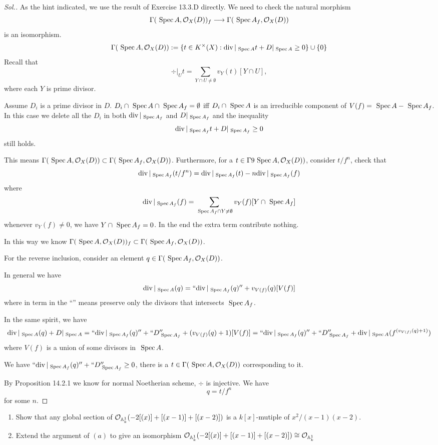 \documentclass[11pt]{book} %
\begin{document}
\begin{proof}[Sol.]
As the hint indicated, we use the result of Exercise 13.3.D directly. We need to check the natural morphism
$$
\Gamma(\text{ Spec\,} A,{\cal O}_X(D))_f\longrightarrow\Gamma(\text{ Spec\,} A_f,{\cal O}_X(D))
$$
is an isomorphism.
$$
\Gamma(\text{ Spec\,} A,{\cal O}_X(D)):=\{t\in K^\times(X):\text{div\,}|_{\text{ Spec\,} A}t+D|_{\text{ Spec\,} A}\geq 0\}\cup \{0\}
$$
Recall that 
$$
\div|_U t=\sum_{Y\cap U\neq \emptyset} v_Y(t)[Y\cap U],
$$
where each $Y$ is prime divisor.

Assume $D_i$ is a prime divisor in $D$.
$D_i\cap \text{ Spec\,} A\cap \text{ Spec\,} A_f=\emptyset$ iff $D_i\cap \text{ Spec\,} A$ is an irreducible component of $V(f)=\text{ Spec\,} A-\text{ Spec\,} A_f$. In this case we delete all the $D_i$ in both $\text{div\,}|_{\text{ Spec\,} A_f}$ and $D|_{\text{ Spec\,} A_f}$ and the inequality 
$$
\text{div\,}|_{\text{ Spec\,} A_f}t+D|_{\text{ Spec\,} A_f}\geq 0
$$ 
still holds.

This means $\Gamma(\text{ Spec\,} A,{\cal O}_X(D))\subset \Gamma(\text{ Spec\,} A_f,{\cal O}_X(D))$. Furthermore, for a $t\in \Gamma9\text{ Spec\,} A,{\cal O}_X(D))$, consider $t/f^n$, check that 
$$
\text{div\,}|_{\text{ Spec\,} A_f}(t/f^n)=\text{div\,}|_{\text{ Spec\,} A_f}(t)-n\text{div\,}|_{\text{ Spec\,} A_f}(f)
$$
where
$$
\text{div\,}|_{\text{ Spec\,} A_f}(f)=\sum_{\text{ Spec\,} A_f\cap Y\neq \emptyset}v_Y(f)[Y\cap \text{ Spec\,} A_f]
$$
whenever $v_Y(f)\neq 0$, we have $Y\cap \text{ Spec\,} A_f=0$. In the end the extra term contribute nothing.

In this way we know $\Gamma(\text{ Spec\,} A,{\cal O}_X(D))_f\subset\Gamma(\text{ Spec\,} A_f,{\cal O}_X(D))$.

For the reverse inclusion, consider an element $q\in \Gamma(\text{ Spec\,} A_f,{\cal O}_X(D))$.

In general
we have
$$
\text{div\,}|_{\text{ Spec\,} A} (q)=``\text{div\,}|_{\text{ Spec\,} A_f}(q)''+v_{V(f)}(q)[V(f)]
$$
where in term in the ``'' means preserve only the divisors that intersects $\text{ Spec\,} A_f$.

In the same spirit, we have 
$$
\text{div\,}|_{\text{ Spec\,} A} (q)+D|_{\text{ Spec\,} A}=``\text{div\,}|_{\text{ Spec\,} A_f}(q)''+``D_{\text{ Spec\,} A_f}''+(v_{V(f)}(q)+1)[V(f)]
= ``\text{div\,}|_{\text{ Spec\,} A_f}(q)''+``D_{\text{ Spec\,} A_f}''+\text{div\,}|_{\text{ Spec\,} A}(f^{(v_{V(f)}(q)+1)})
$$
where $V(f)$ is a union of some divisors in $\text{ Spec\,} A$.

We have $``\text{div\,}|_{\text{ Spec\,} A_f}(q)''+``D_{\text{ Spec\,} A_f}''\geq 0$, there is a $t\in \Gamma(\text{ Spec\,} A,{\cal O}_X(D))$ corresponding to it.

By Proposition 14.2.1 we know for normal Noetherian scheme, $\div$ is injective. We have
$$
q=t/f^n
$$
for some $n$.
\end{proof}
\begin{exr}
\begin{enumerate}[label=(\alph*)]
\item Show that any global section of ${\cal O}_{\mathbb A^1_k}(-2[(x)]+[(x-1)]+[(x-2)])$ is a $k[x]$-mutiple of $x^2/(x-1)(x-2)$.
\item Extend the argument of $(a)$ to give an isomorphism
$
{\cal O}_{\mathbb A^1_k}(-2[(x)]+[(x-1)]+[(x-2)])\cong {\cal O}_{\mathbb A^1_k}
$ 
\end{enumerate}
\end{exr}
\end{document}
